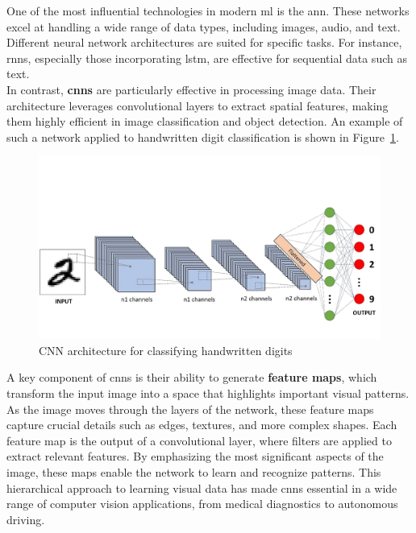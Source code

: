 One of the most influential technologies in modern \gls{ml} is the \gls{ann}. These networks excel at handling a wide range of data types, including images, audio, and text. Different neural network architectures are suited for specific tasks. For instance, \glspl{rnn}, especially those incorporating \gls{lstm}, are effective for sequential data such as text. \\

In contrast, \textbf{\glspl{cnn}} are particularly effective in processing image data. Their architecture leverages convolutional layers to extract spatial features, making them highly efficient in image classification and object detection. An example of such a network applied to handwritten digit classification is shown in Figure~\ref{fig:convolutional-neural-network}. \\

\begin{figure}[h!] \centering \includegraphics[width=0.75\linewidth]{figures/theory/machine-learning/convolutional-neural-network.png} \caption[CNN architecture for handwritten digit classification]{CNN architecture for classifying handwritten digits \cite{medium:cnn}} \label{fig:convolutional-neural-network} \end{figure}

A key component of \glspl{cnn} is their ability to generate \textbf{feature maps}, which transform the input image into a space that highlights important visual patterns. As the image moves through the layers of the network, these feature maps capture crucial details such as edges, textures, and more complex shapes. Each feature map is the output of a convolutional layer, where filters are applied to extract relevant features. By emphasizing the most significant aspects of the image, these maps enable the network to learn and recognize patterns. This hierarchical approach to learning visual data has made \glspl{cnn} essential in a wide range of computer vision applications, from medical diagnostics to autonomous driving. \\

